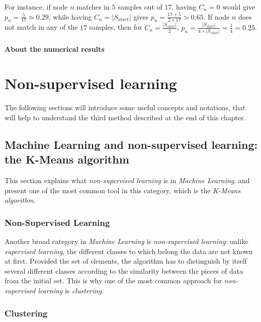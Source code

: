 \documentclass{report}
\begin{document}
For instance, if node $n$ matches in $5$ samples out of $17$, having $C_{n} = 0$ would give $p_{n} = \frac{5}{17} \simeq 0.29$, while having $C_{n} = |S_{start}|$ gives $p_{n} = \frac{17 + 5}{2 \times 17} \simeq 0.65 $. If node $n$ does not match in any of the $17$ samples, then for $C_{n} = \frac{|S_{start}|}{2}$, $p_{n} = \frac{|S_{start}|}{4 \times |S_{start}|} = \frac{1}{4} = 0.25$.\\

\subsubsection{About the numerical results}


\chapter{Non-supervised learning}

The following sections will introduce some useful concepts and notations, that will help to understand the third method described at the end of this chapter.

\section{Machine Learning and non-supervised learning: the K-Means algorithm}

This section explains what \emph{non-supervised learning} is in \emph{Machine Learning}, and present one of the most common tool in this category, which is the \emph{K-Means algorithm}.

\subsection{Non-Supervised Learning}

Another broad category in \emph{Machine Learning} is \emph{non-supervised learning}: unlike \emph{supervised learning}, the different classes to which belong the data are not known at first. Provided the set of elements, the algorithm has to distinguish by itself several different classes according to the similarity between the pieces of data from the initial set. This is why one of the most common approach for \emph{non-supervised learning} is \emph{clustering}.

\subsection{Clustering}
\end{document}
